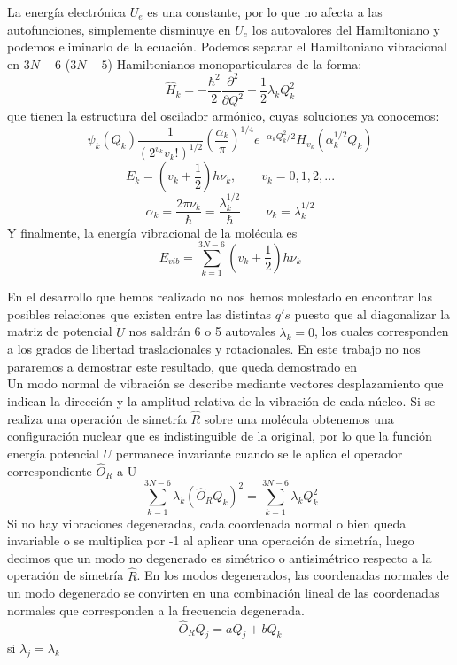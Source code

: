 \documentclass[a4paper]{article}
\begin{document}
La energía electrónica $U_e$ es una constante, por lo que no afecta a las autofunciones, simplemente disminuye en $U_e$ los autovalores del Hamiltoniano y podemos eliminarlo de la ecuación. Podemos separar el Hamiltoniano vibracional en $3N-6$ ($3N-5$) Hamiltonianos monoparticulares de la forma:
\begin{equation}
\hat H_k = -\frac{\hbar^2}{2}\frac{\partial^2}{\partial Q^2}+\frac{1}{2}\lambda_kQ_k^2
\end{equation}
que tienen la estructura del oscilador armónico, cuyas soluciones ya conocemos:
\begin{equation}
\psi_k(Q_k)\frac{1}{\left(2^{v_k}v_k!\right)^{1/2}}\left(\frac{\alpha_k}{\pi}\right)^{1/4}e^{-\alpha_kQ^2_k/2}H_{v_k}(\alpha_k^{1/2}Q_k)
\end{equation}
\begin{equation}
E_k=\left(v_k+\frac{1}{2}\right)h\nu_k,	\qquad v_k=0,1,2,...
\end{equation}
\begin{equation}
\alpha_k=\frac{2\pi\nu_k}{\hbar}=\frac{\lambda_k^{1/2}}{\hbar} \qquad \nu_k=\lambda_k^{1/2}
\end{equation}
Y finalmente, la energía vibracional de la molécula es
\begin{equation}
E_{vib}=\sum_{k=1}^{3N-6}\left(v_k+\frac{1}{2}\right)h\nu_k
\end{equation}

En el desarrollo que hemos realizado no nos hemos molestado en encontrar las posibles relaciones que existen entre las distintas $q's$ puesto que al diagonalizar la matriz de potencial $\tilde U$ nos saldrán 6 o 5 autovales $\lambda_k = 0$, los cuales corresponden a los grados de libertad traslacionales y rotacionales. En este trabajo no nos pararemos a demostrar este resultado, que queda demostrado en \cite[pp 22-25]{wilson1980} \\

Un modo normal de vibración se describe mediante vectores desplazamiento que indican la dirección y la amplitud relativa de la vibración de cada núcleo. Si se realiza una operación de simetría $\hat R$ sobre una molécula obtenemos una configuración nuclear que es indistinguible de la original, por lo que la función energía potencial $U$ permanece invariante cuando se le aplica el operador correspondiente $\hat O_R$ a U
\begin{equation}
\sum_{k=1}^{3N-6}\lambda_k(\hat O_RQ_k)^2=\sum_{k=1}^{3N-6}\lambda_kQ_k^2
\end{equation} 
Si no hay vibraciones degeneradas, cada coordenada normal o bien queda invariable o se multiplica por -1 al aplicar una operación de simetría, luego decimos que un modo no degenerado es simétrico o antisimétrico respecto a la operación de simetría $\hat R$. En los modos degenerados, las coordenadas normales de un modo degenerado se convirten en una combinación lineal de las coordenadas normales que corresponden a la frecuencia degenerada.
\begin{equation}
\hat O_RQ_j = aQ_j + bQ_k
\end{equation}
si $\lambda_j=\lambda_k$\\
\end{document}
